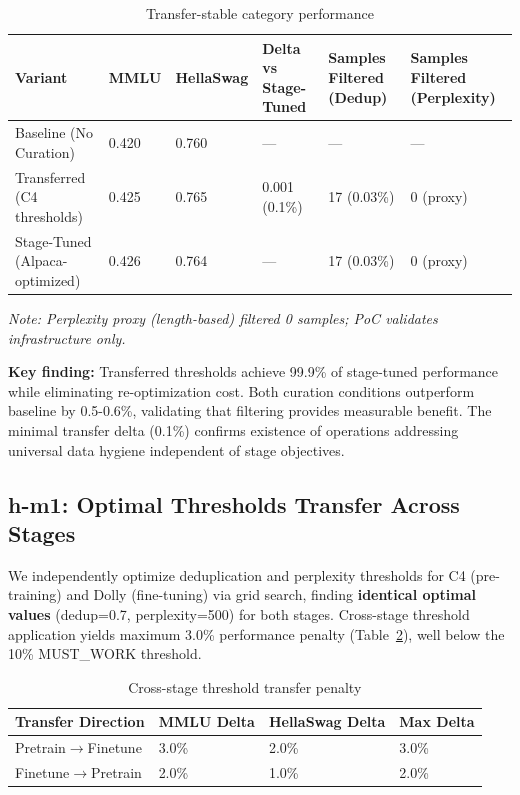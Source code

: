 \begin{table}[h]
\centering
\small
\begin{tabular}{llllll}
\toprule
\textbf{Variant} & \textbf{MMLU} & \textbf{HellaSwag} & \textbf{Delta vs Stage-Tuned} & \textbf{Samples Filtered (Dedup)} & \textbf{Samples Filtered (Perplexity)} \\
\midrule
Baseline (No Curation) & 0.420 & 0.760 & — & — & — \\
Transferred (C4 thresholds) & 0.425 & 0.765 & 0.001 (0.1\%) & 17 (0.03\%) & 0 (proxy) \\
Stage-Tuned (Alpaca-optimized) & 0.426 & 0.764 & — & 17 (0.03\%) & 0 (proxy) \\
\bottomrule
\end{tabular}
\caption{Transfer-stable category performance}
\label{tab:he1}
\end{table}

\emph{Note: Perplexity proxy (length-based) filtered 0 samples; PoC validates infrastructure only.}

\textbf{Key finding:} Transferred thresholds achieve 99.9\% of stage-tuned performance while eliminating re-optimization cost. Both curation conditions outperform baseline by 0.5-0.6\%, validating that filtering provides measurable benefit. The minimal transfer delta (0.1\%) confirms existence of operations addressing universal data hygiene independent of stage objectives.

\subsection{h-m1: Optimal Thresholds Transfer Across Stages}

We independently optimize deduplication and perplexity thresholds for C4 (pre-training) and Dolly (fine-tuning) via grid search, finding \textbf{identical optimal values} (dedup=0.7, perplexity=500) for both stages. Cross-stage threshold application yields maximum 3.0\% performance penalty (Table~\ref{tab:hm1}), well below the 10\% MUST\_WORK threshold.

\begin{table}[h]
\centering
\small
\begin{tabular}{llll}
\toprule
\textbf{Transfer Direction} & \textbf{MMLU Delta} & \textbf{HellaSwag Delta} & \textbf{Max Delta} \\
\midrule
Pretrain$\rightarrow$Finetune & 3.0\% & 2.0\% & 3.0\% \\
Finetune$\rightarrow$Pretrain & 2.0\% & 1.0\% & 2.0\% \\
\bottomrule
\end{tabular}
\caption{Cross-stage threshold transfer penalty}
\label{tab:hm1}
\end{table}

